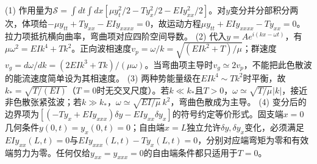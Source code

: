 (1) 作用量为\(\mathcal S=\int dt\int dx[\mu y_t^2/2-Ty_x^2/2-EIy_{xx}^2/2]\)。对\(y\)变分并分部积分两次，体项给\(-\mu y_{tt}+Ty_{xx}-EIy_{xxxx}=0\)，故运动方程\(\mu y_{tt}+EIy_{xxxx}-Ty_{xx}=0\)。拉力项抵抗横向曲率，弯曲项对应四阶空间导数。
(2) 代入\(y=Ae^{i(kx-\omega t)}\)，有\(\mu\omega^2=EIk^4+Tk^2\)。正向波相速度\(v_p=\omega/k=\sqrt{(EI k^2+T)/\mu}\)；群速度\(v_g=d\omega/dk=(2EIk^3+Tk)/(\mu\omega)\)。当弯曲项主导时\(v_g\simeq2v_p\)，不能把此色散波的能流速度简单设为其相速度。
(3) 两种势能量级在\(EIk^4\sim Tk^2\)时平衡，故\(k_*=\sqrt{T/(EI)}\)（\(T=0\)时无交叉尺度）。若\(k\ll k_*\)且\(T>0\)，\(\omega\simeq\sqrt{T/\mu}|k|\)，接近非色散张紧弦波；若\(k\gg k_*\)，\(\omega\simeq\sqrt{EI/\mu}\,k^2\)，弯曲色散成为主导。
(4) 变分后的边界项为\([(-Ty_x+EI y_{xxx})\delta y-EIy_{xx}\delta y_x]\)的符号约定等价形式。固支端\(x=0\)几何条件\(y(0,t)=y_x(0,t)=0\)；自由端\(x=L\)独立允许\(\delta y,\delta y_x\)变化，必须满足\(EIy_{xx}(L,t)=0\)与\(EIy_{xxx}(L,t)-Ty_x(L,t)=0\)，分别对应端弯矩为零和有效端剪力为零。任何仅给\(y_{xx}=y_{xxx}=0\)的自由端条件都只适用于\(T=0\)。
